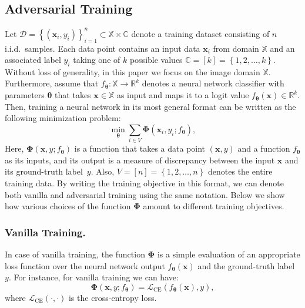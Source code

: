 \documentclass[runningheads]{llncs}
\begin{document}
\subsection{Adversarial Training}\label{sec:sec:adversarial_training}

Let $\mathcal{D}=\left\{\left(\boldsymbol{x}_{i}, y_{i}\right)\right\}_{i=1}^{n} \subset  \mathbb{X} \times \mathbb{C}$ denote a training dataset consisting of $n$ i.i.d.~samples.
Each data point contains an input data $\boldsymbol{x}_{i}$ from domain $\mathbb{X}$ and an associated label $y_{i}$ taking one of $k$ possible values $\mathbb{C}=\left[k\right]=\left\{1, 2, \dots, k\right\}$.
Without loss of generality, in this paper we focus on the image domain $\mathbb{X}$.
Furthermore, assume that $f_{\boldsymbol{\theta}}: \mathbb{X} \rightarrow \mathbb{R}^{k}$ denotes a neural network classifier with parameters $\boldsymbol{\theta}$ that takes $\boldsymbol{x} \in \mathbb{X}$ as input and maps it to a logit value $f_{\boldsymbol{\theta}}(\boldsymbol{x}) \in \mathbb{R}^{k}$.
Then, training a neural network in its most general format can be written as the following minimization problem:
\begin{equation}\label{eq:nn_training_objective}
    \min_{\boldsymbol{\theta}} \sum_{i \in V} \boldsymbol{\Phi} \left(\boldsymbol{x}_{i}, y_{i}; f_{\boldsymbol{\theta}}\right),
\end{equation}
Here, $\boldsymbol{\Phi} \left(\boldsymbol{x}, y; f_{\boldsymbol{\theta}}\right)$ is a function that takes a data point $\left(\boldsymbol{x}, y\right)$ and a function $f_{\boldsymbol{\theta}}$ as its inputs, and its output is a measure of discrepancy between the input $\boldsymbol{x}$ and its ground-truth label~$y$.
Also, $V=\left[n\right]=\left\{1, 2, \dots, n\right\}$ denotes the entire training data.
By writing the training objective in this format, we can denote both vanilla and adversarial training using the same notation.
Below we show how various choices of the function $\boldsymbol{\Phi}$ amount to different training objectives.

\subsubsection{Vanilla Training.}
In case of vanilla training, the function $\boldsymbol{\Phi}$ is a simple evaluation of an appropriate loss function over the neural network output $f_{\boldsymbol{\theta}}(\boldsymbol{x})$ and the ground-truth label $y$.
For instance, for vanilla training we can have:
\begin{equation}\label{eq:vanilla_functional}
    \boldsymbol{\Phi} \left(\boldsymbol{x}, y; f_{\boldsymbol{\theta}}\right) = \mathcal{L}_{\mathrm{CE}}\left(f_{\boldsymbol{\theta}}(\boldsymbol{x}), y\right),
\end{equation}
where $\mathcal{L}_{\mathrm{CE}}(\cdot, \cdot)$ is the cross-entropy loss.
\end{document}
